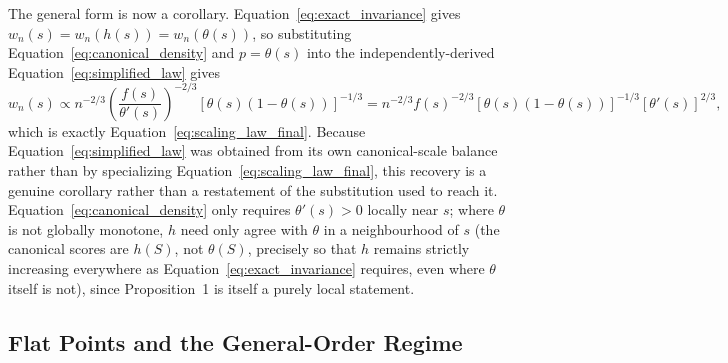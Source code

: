 \documentclass[11pt]{article}
\begin{document}
	The general form is now a corollary. Equation~\ref{eq:exact_invariance} gives $w_n(s)=w_n(h(s))=w_n(\theta(s))$, so substituting Equation~\ref{eq:canonical_density} and $p=\theta(s)$ into the independently-derived Equation~\ref{eq:simplified_law} gives
	\begin{equation}
		w_n(s) \propto n^{-2/3}\left(\frac{f(s)}{\theta'(s)}\right)^{-2/3}[\theta(s)(1-\theta(s))]^{-1/3} = n^{-2/3}f(s)^{-2/3}[\theta(s)(1-\theta(s))]^{-1/3}[\theta'(s)]^{2/3},
		\label{eq:general_law_corollary}
	\end{equation}
	which is exactly Equation~\ref{eq:scaling_law_final}. Because Equation~\ref{eq:simplified_law} was obtained from its own canonical-scale balance rather than by specializing Equation~\ref{eq:scaling_law_final}, this recovery is a genuine corollary rather than a restatement of the substitution used to reach it. Equation~\ref{eq:canonical_density} only requires $\theta'(s)>0$ locally near $s$; where $\theta$ is not globally monotone, $h$ need only agree with $\theta$ in a neighbourhood of $s$ (the canonical scores are $h(S)$, not $\theta(S)$, precisely so that $h$ remains strictly increasing everywhere as Equation~\ref{eq:exact_invariance} requires, even where $\theta$ itself is not), since Proposition~1 is itself a purely local statement.

	\subsection{Flat Points and the General-Order Regime}
\end{document}

